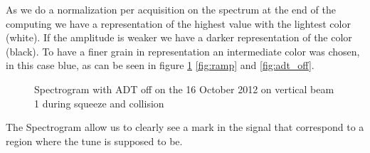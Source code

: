 As we do a normalization per acquisition on the spectrum at the end of the computing we have a representation of the highest value with the lightest color (white). If the amplitude is weaker we have a darker representation of the color (black). To have a finer grain in representation an intermediate color was chosen, in this case blue, as can be seen in figure \ref{fig:squeeze} \ref{fig:ramp} and \ref{fig:adt_off}.

\begin{figure}[H]
\caption{Spectrogram with ADT off on the 16 October 2012 on vertical beam 1 during squeeze and collision}
\label{fig:squeeze}
\centering
\end{figure}

The Spectrogram allow us to clearly see a mark in the signal that correspond to a region where the tune is supposed to be.
